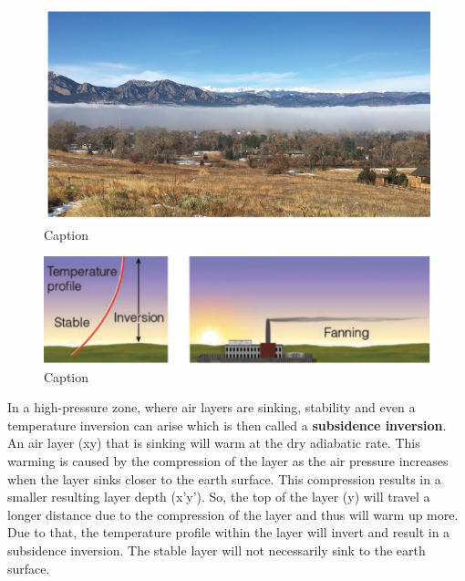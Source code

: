 \documentclass[12pt,oneside]{book}
\begin{document}
\begin{figure}

{\centering \includegraphics[width=1\linewidth]{figures/Figure34} 

}

\caption{Caption}\label{fig:chimney}
\end{figure}

\begin{figure}

{\centering \includegraphics[width=1\linewidth]{figures/Figure35} 

}

\caption{Caption}\label{fig:Fanning}
\end{figure}

In a high-pressure zone, where air layers are sinking, stability and
even a temperature inversion can arise which is then called a
\textbf{subsidence inversion}. An air layer (xy) that is sinking will
warm at the dry adiabatic rate. This warming is caused by the
compression of the layer as the air pressure increases when the layer
sinks closer to the earth surface. This compression results in a smaller
resulting layer depth (x'y'). So, the top of the layer (y) will travel a
longer distance due to the compression of the layer and thus will warm
up more. Due to that, the temperature profile within the layer will
invert and result in a subsidence inversion. The stable layer will not
necessarily sink to the earth surface.
\end{document}
